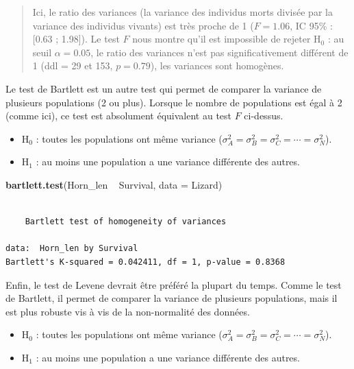 \documentclass[a4paperpaper,]{article}
\newenvironment{Shaded}{\begin{snugshade}}{\end{snugshade}}
\newcommand{\DataTypeTok}[1]{\textcolor[rgb]{0.00,0.34,0.68}{#1}}
\newcommand{\KeywordTok}[1]{\textcolor[rgb]{0.12,0.11,0.11}{\textbf{#1}}}
\newcommand{\NormalTok}[1]{\textcolor[rgb]{0.12,0.11,0.11}{#1}}
\newcommand{\OperatorTok}[1]{\textcolor[rgb]{0.12,0.11,0.11}{#1}}
\newcommand{\StringTok}[1]{\textcolor[rgb]{0.75,0.01,0.01}{#1}}
\providecommand{\tightlist}{%
  \setlength{\itemsep}{0pt}\setlength{\parskip}{0pt}}
\begin{document}
\begin{quote}
Ici, le ratio des variances (la variance des individus morts divisée par la variance des individus vivants) est très proche de 1 (\(F = 1.06\), IC 95\% : {[}0.63 ; 1.98{]}). Le test \(F\) nous montre qu'il est impossible de rejeter H\(_0\) : au seuil \(\alpha = 0.05\), le ratio des variances n'est pas significativement différent de 1 (ddl = 29 et 153, \(p = 0.79\)), les variances sont homogènes.
\end{quote}

Le test de Bartlett est un autre test qui permet de comparer la variance de plusieurs populations (2 ou plus). Lorsque le nombre de populations est égal à 2 (comme ici), ce test est absolument équivalent au test \(F\) ci-dessus.

\begin{itemize}
\tightlist
\item
  H\(_0\) : toutes les populations ont même variance (\(\sigma^2_A = \sigma^2_B = \sigma^2_C = \cdots = \sigma^2_N\)).
\item
  H\(_1\) : au moins une population a une variance différente des autres.
\end{itemize}

\begin{Shaded}
\begin{Highlighting}[]
\KeywordTok{bartlett.test}\NormalTok{(Horn_len }\OperatorTok{~}\StringTok{ }\NormalTok{Survival, }\DataTypeTok{data =}\NormalTok{ Lizard)}
\end{Highlighting}
\end{Shaded}

\begin{verbatim}

    Bartlett test of homogeneity of variances

data:  Horn_len by Survival
Bartlett's K-squared = 0.042411, df = 1, p-value = 0.8368
\end{verbatim}

Enfin, le test de Levene devrait être préféré la plupart du temps. Comme le test de Bartlett, il permet de comparer la variance de plusieurs populations, mais il est plus robuste vis à vis de la non-normalité des données.

\begin{itemize}
\tightlist
\item
  H\(_0\) : toutes les populations ont même variance (\(\sigma^2_A = \sigma^2_B = \sigma^2_C = \cdots = \sigma^2_N\)).
\item
  H\(_1\) : au moins une population a une variance différente des autres.
\end{itemize}
\end{document}
